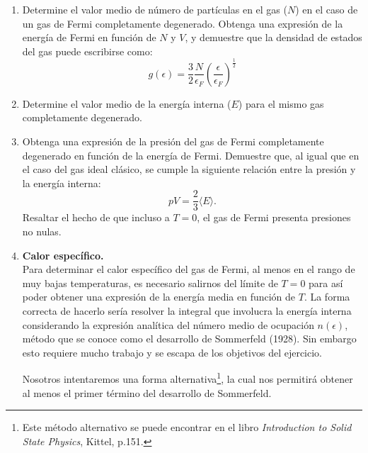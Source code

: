 \documentclass[a4paper,11pt]{article}
\begin{document}
\begin{enumerate}[label=(\alph*),
                  leftmargin=2\parindent,
                  rightmargin=2\parindent]

    \item{Determine el valor medio de número de partículas en el gas
          ($N$) en el caso de un gas de Fermi completamente degenerado.
          Obtenga una expresión de la energía de Fermi en función de
          $N$ y $V$, y demuestre que la densidad de estados del gas
          puede escribirse como:
          $$
          g(\epsilon) =
            \frac{3}{2} \frac{N}{\epsilon_F} \left(
            \frac{\epsilon}{\epsilon_F} \right)^{\frac{1}{2}}
          $$
          }

    \item{Determine el valor medio de la energía interna ($E$) para el
          mismo gas completamente degenerado.
          }

    \item{Obtenga una expresión de la presión del gas de Fermi completamente
          degenerado en función de la energía de Fermi.
          Demuestre que, al igual que en el caso del gas ideal
          clásico, se cumple la siguiente relación entre la presión
          y la energía interna:
          $$ pV = \frac{2}{3} \langle E \rangle. $$
          Resaltar el hecho de que incluso a $T = 0$, el gas
          de Fermi presenta presiones no nulas.
          }

    \item{\textbf{Calor específico.}\\
          Para determinar el calor específico del gas de Fermi, al
          menos en el rango de muy bajas temperaturas, es necesario
          salirnos del límite de $T = 0$ para así poder obtener una
          expresión de la energía media en función de $T$.
          La forma correcta de hacerlo sería resolver la integral que
          involucra la energía interna considerando la expresión analítica
          del número medio de ocupación $n(\epsilon)$, método que se
          conoce como el desarrollo de Sommerfeld (1928).
          Sin embargo esto requiere mucho trabajo y se escapa de los
          objetivos del ejercicio.

          Nosotros intentaremos una forma alternativa\footnote{Este
          método alternativo se puede encontrar en el libro
          \emph{Introduction to Solid State Physics}, Kittel, p.151.},
          la cual nos permitirá obtener al menos el primer término del
          desarrollo de Sommerfeld.

}
\end{enumerate}
\end{document}
